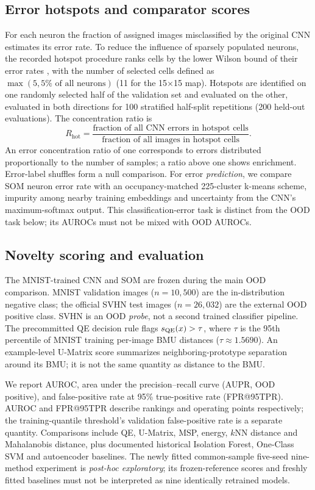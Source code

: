 \documentclass[11pt]{article}
\begin{document}
\subsection{Error hotspots and comparator scores}
For each neuron the fraction of assigned images misclassified by the original CNN estimates its error rate. To reduce the influence of sparsely populated neurons, the recorded hotspot procedure ranks cells by the lower Wilson bound of their error rates \parencite{wilson1927probable}, with the number of selected cells defined as $\max(5,5\%\text{ of all neurons})$ (11 for the 15$\times$15 map). Hotspots are identified on one randomly selected half of the validation set and evaluated on the other, evaluated in both directions for 100 stratified half-split repetitions (200 held-out evaluations). The concentration ratio is
\begin{equation}\label{eq:ratio}
 R_{\mathrm{hot}}=\frac{\text{fraction of all CNN errors in hotspot cells}}{\text{fraction of all images in hotspot cells}}.
\end{equation}
An error concentration ratio of one corresponds to errors distributed proportionally to the number of samples; a ratio above one shows enrichment. Error-label shuffles form a null comparison. For error \emph{prediction}, we compare SOM neuron error rate with an occupancy-matched 225-cluster k-means scheme, impurity among nearby training embeddings and uncertainty from the CNN's maximum-softmax output. This classification-error task is distinct from the OOD task below; its AUROCs must not be mixed with OOD AUROCs.

\subsection{Novelty scoring and evaluation}\label{sec:oodmethod}
The MNIST-trained CNN and SOM are frozen during the main OOD comparison. MNIST validation images ($n=10{,}500$) are the in-distribution negative class; the official SVHN test images ($n=26{,}032$) are the external OOD positive class. SVHN is an OOD \emph{probe}, not a second trained classifier pipeline. The precommitted QE decision rule flags $s_{\rm QE}(x)>\tau$, where $\tau$ is the 95th percentile of MNIST training per-image BMU distances ($\tau\approx1.5690$). An example-level U-Matrix score summarizes neighboring-prototype separation around its BMU; it is not the same quantity as distance to the BMU.

We report AUROC, area under the precision--recall curve (AUPR, OOD positive), and false-positive rate at 95\% true-positive rate (FPR@95TPR). AUROC and FPR@95TPR describe rankings and operating points respectively; the training-quantile threshold's validation false-positive rate is a separate quantity. Comparisons include QE, U-Matrix, MSP, energy, $k$NN distance and Mahalanobis distance, plus documented historical Isolation Forest, One-Class SVM and autoencoder baselines. The newly fitted common-sample five-seed nine-method experiment is \emph{post-hoc exploratory}; its frozen-reference scores and freshly fitted baselines must not be interpreted as nine identically retrained models.
\end{document}
